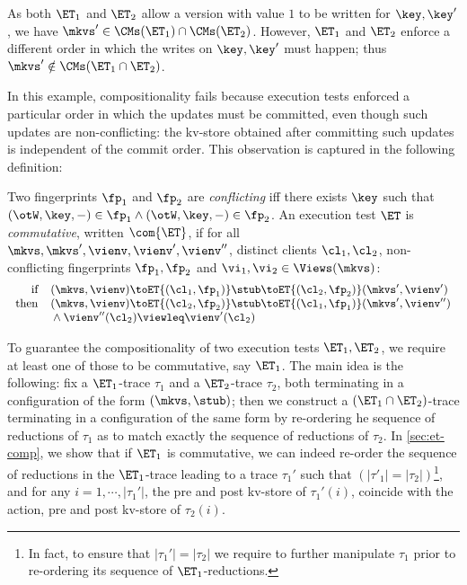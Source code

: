 \noindent As both $\ET_1$ and $\ET_2$ allow a version with value $1$ to be written for 
$\key, \key'$,  we have $\mkvs' \in \CMs(\ET_1) \cap \CMs(\ET_2)$. 
However, $\ET_1$ and $\ET_2$ enforce a different order in which the writes on $\key, \key'$ must happen; 
thus $\mkvs' \notin \CMs(\ET_1 \cap \ET_2)$. 

In this example, compositionality fails because execution tests 
enforced a particular order in which the updates must be committed, even though such updates 
are non-conflicting: the kv-store obtained after committing such updates is independent of the commit order. 
This observation is captured in the following definition: 




\begin{definition}
\label{def:et-comm}
Two fingerprints $\fp_1$ and $\fp_2$ are \emph{conflicting} 
iff there exists $\key$ such that 
$(\otW, \key, -) \in \fp_1 \land (\otW, \key, -) \in \fp_2$. 
An execution test $\ET$ is \emph{commutative}, written $\com{\ET}$, if 
for all \( \mkvs, \mkvs', \vienv, \vienv',\vienv''\), distinct clients \( \cl_1, \cl_2 \), non-conflicting fingerprints \( \fp_1, \fp_2  \) and \( \vi_1, \vi_2 \in \Views(\mkvs) \):%
%
{%
\[
\small
\begin{array}{@{}r @{\hspace{10pt}} l @{}}
	\text{if} &  
	(\mkvs, \vienv) \toET{(\cl_1, \fp_1)} 
	\stub \toET{(\cl_2, \fp_2)} (\mkvs', \vienv') \\
	\text{then} & (\mkvs, \vienv) \toET{(\cl_2, \fp_2)}
    \stub \toET{(\cl_1, \fp_1)} (\mkvs', \vienv'') \\
    & {} \land \vienv''(\cl_2) \viewleq \vienv'(\cl_2)
\end{array}
\]%
}%
\end{definition}

To guarantee the compositionality of two execution tests $\ET_1, \ET_2$, we 
require at least one of those to be commutative, say $\ET_1$. The main idea 
is the following: fix a $\ET_1$-trace $\tau_1$ and a $\ET_2$-trace $\tau_2$, both terminating in a configuration 
of the form $(\mkvs, \stub)$; then we construct a $(\ET_1 \cap \ET_2)$-trace terminating 
in a configuration of the same form by re-ordering he sequence of 
reductions of $\tau_1$ as to match exactly the sequence of 
reductions of $\tau_2$. 
In \cref{sec:et-comp}, we show that if $\ET_1$ is commutative, 
we can indeed re-order the sequence of reductions in the 
$\ET_1$-trace leading to a trace $\tau_1'$ such that $(\lvert \tau'_1 \rvert = \lvert \tau_2 \rvert)$\footnote{In fact, 
to ensure that $\lvert \tau_1' \rvert = \lvert \tau_2 \rvert$ we require to further manipulate 
$\tau_1$ prior to re-ordering its sequence of $\ET_1$-reductions.}, 
and for any 
$i=1,\cdots, \lvert \tau_1'\rvert$, the pre and post kv-store of $\tau_1'(i)$,
 coincide with the action, pre and post kv-store 
of $\tau_2(i)$.


